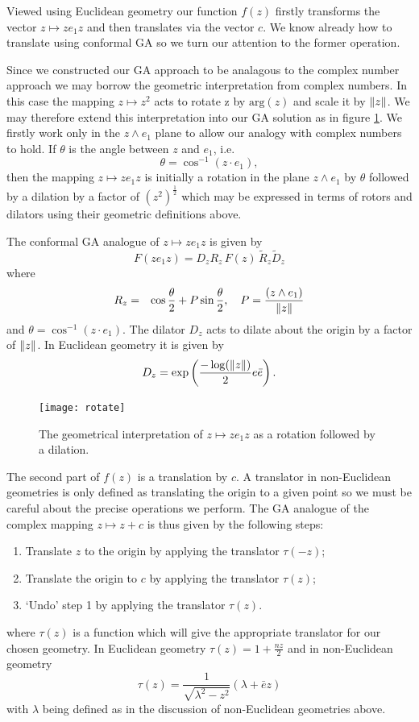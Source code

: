 Viewed using Euclidean geometry our function $f(z)$ firstly transforms the vector
$z \mapsto ze_1z$ and then translates via the vector $c$. We know already how to translate
using conformal GA so we turn our attention to the former operation.

Since we constructed our GA approach to be analagous to the complex number approach we
may borrow the geometric interpretation from complex numbers. In this case the mapping 
$z \mapsto z^2$ acts to rotate z by $\mathrm{arg}(z)$ and scale it by
$\left\Vert z \right\Vert$. We may therefore extend this interpretation into our GA solution as in
figure \ref{fig:rotate}. We firstly work only in the $z \wedge e_1$ plane to allow
our analogy with complex numbers to hold. If $\theta$ is the angle between $z$ and
$e_1$, i.e.
\[
\theta = \cos^{-1}(z \cdot e_1),
\] 
then the mapping $z \mapsto ze_1z$ is initially a rotation in the plane $z \wedge e_1$
by $\theta$ followed by a dilation by a factor of $(z^2)^\frac{1}{2}$ 
which may be expressed in terms of rotors and dilators using their geometric
definitions above.

\begin{definition}
The conformal GA analogue of $z \mapsto ze_1z$ is given by
\[
F(ze_1z) = D_z R_z\,F(z)\,\tilde{R}_z \tilde{D}_z
\]
where
\begin{eqnarray*}
R_z & = & \cos \frac{\theta}{2} + P \sin \frac{\theta}{2},
    \quad
P = \frac{(z \wedge e_1)}{\left\Vert z \right\Vert}
\end{eqnarray*}
and $\theta = \cos^{-1}(z \cdot e_1)$.
The dilator $D_z$ acts to dilate about the origin by a factor of
$\left\Vert z \right\Vert$. In Euclidean geometry it is given by
\[
D_z = \exp\left( \frac{-\log(\left\Vert z \right\Vert)}{2} e\bar{e} \right).
\]
\end{definition}

\begin{figure}
\centering
\texttt{[image: rotate]}
\caption{\label{fig:rotate}%
  The geometrical interpretation of $z \mapsto ze_1z$ as a rotation followed by a dilation.
}
\end{figure}

The second part of $f(z)$ is a translation by $c$. A translator in non-Euclidean
geometries is only defined as translating the origin to a given point so we must be
careful about the precise operations we perform. The GA analogue of the
complex mapping $z \mapsto z + c$ is thus given by the following steps:
\begin{enumerate}
\item Translate $z$ to the origin by applying the translator $\tau(-z)$;
\item Translate the origin to $c$ by applying the translator $\tau(z)$;
\item `Undo' step 1 by applying the translator $\tau(z)$.
\end{enumerate}
where $\tau(z)$ is a function which will give the appropriate translator for our 
chosen geometry. In Euclidean geometry $\tau(z) = 1 + \frac{nz}{2}$ and in
non-Euclidean geometry
\[
\tau(z) = \frac{1}{\sqrt{\lambda^2 - z^2}}(\lambda + \bar{e}z)
\]
with $\lambda$ being defined as in the discussion of non-Euclidean geometries above.


